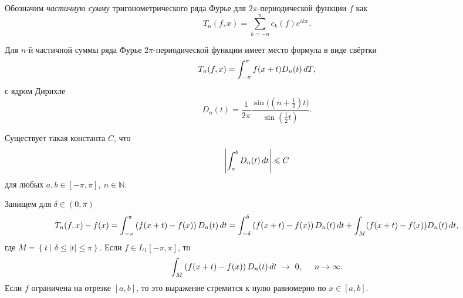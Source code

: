 \begin{to_def}
    Обозначим \textit{частичную сумму} тригонометрического ряда Фурье для $2\pi$-периодической функции $f$ как
    \begin{equation*}
        T_n (f, x) = \sum_{k=-n}^n c_k (f) e^{ikx}.
    \end{equation*}
\end{to_def}

\begin{to_lem}
    Для $n$-й частичной суммы ряда Фурье $2\pi$-периодической функции имеет место формула в виде свёртки
    \begin{equation*}
        T_n (f, x) = \int_{-\pi}^{\pi} f(x+t) D_n (t) \, d T,
    \end{equation*}
    с ядром Дирихле
    \begin{equation*}
        D_n (t) = \frac{1}{2\pi} \frac{\sin \big(\left(n+\frac{1}{2}\right) t\big)}{\sin\left(\frac{1}{2} t\right)}.
    \end{equation*}
\end{to_lem}


\begin{to_lem}
    Существует такая константа $C$, что 
    \begin{equation*}
        \left|
        \int_a^b D_n (t) \, d t
        \right| \leqslant C
    \end{equation*}
    для любых $a, b \in [-\pi, \pi], \ n \in \mathbb{N}$.
\end{to_lem}

\begin{to_thr}
    Запищем для $\delta \in (0, \pi)$
    \begin{equation*}
        T_n (f, x) - f(x) = 
        \int_{-\pi}^{\pi} 
        \left(
            f(x+t) - f(x)
        \right) D_n (t) \, d t =
        \int_{-\delta}^{\delta} \left(
            f(x+t) - f(x)
        \right) D_n (t) \, d t + 
        \int_M 
        (f(x+t)-f(x)) D_n (t) \, d t,
    \end{equation*}
    где $M = \left\{t \mid \delta \leq |t| \leq \pi\right\}$. Если $f \in L_1 [-\pi, \pi]$, то
    \begin{equation*}
        \int_M \left(
            f(x+t) - f(x)
        \right) D_n (t) \, d t
        \ \to \ 0, \hspace{0.5 cm} n \to \infty.
    \end{equation*}
    Если $f$ ограничена на отрезке $[a, b]$, то это выражение стремится к нулю равномерно по $x \in [a, b]$.
\end{to_thr}


